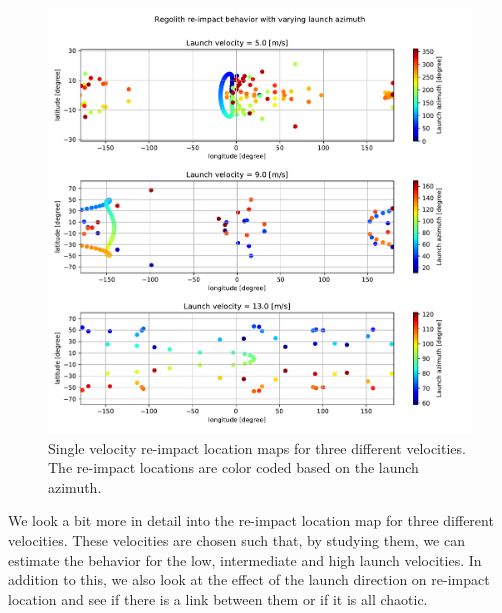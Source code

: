 \begin{figure}[htb]
\centering
\captionsetup{justification=centering}
\includegraphics[width=\textwidth, height=0.6\textheight, keepaspectratio=true]{Images/longest_edge_no_perturbations/re-impact_behavior_with_azimuth.pdf}
\caption{Single velocity re-impact location maps for three different velocities. The re-impact locations are color coded based on the launch azimuth.}
\label{fig:crashmap_launchAzimuth_noSP}
\end{figure}
\FloatBarrier
We look a bit more in detail into the re-impact location map for three different velocities. These velocities are chosen such that, by studying them, we can estimate the behavior for the low, intermediate and high launch velocities. In addition to this, we also look at the effect of the launch direction on re-impact location and see if there is a link between them or if it is all chaotic.
%
\newline\newline
%
